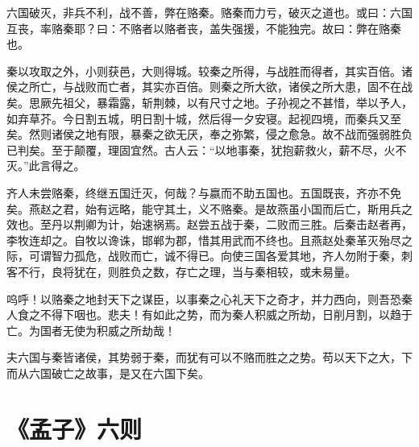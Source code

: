 \documentclass[12pt,UTF-8,openany]{ctexbook}
\begin{document}
\begin{normalsize}
    
    六国破灭，非兵不利，战不善，弊在赂秦。赂秦而力亏，破灭之道也。或曰：六国互丧，率赂秦耶？曰：不赂者以赂者丧，盖失强援，不能独完。故曰：弊在赂秦也。
    
    秦以攻取之外，小则获邑，大则得城。较秦之所得，与战胜而得者，其实百倍。诸侯之所亡，与战败而亡者，其实亦百倍。则秦之所大欲，诸侯之所大患，固不在战矣。思厥先祖父，暴霜露，斩荆棘，以有尺寸之地。子孙视之不甚惜，举以予人，如弃草芥。今日割五城，明日割十城，然后得一夕安寝。起视四境，而秦兵又至矣。然则诸侯之地有限，暴秦之欲无厌，奉之弥繁，侵之愈急。故不战而强弱胜负已判矣。至于颠覆，理固宜然。古人云：“以地事秦，犹抱薪救火，薪不尽，火不灭。”此言得之。
    
    齐人未尝赂秦，终继五国迁灭，何哉？与嬴而不助五国也。五国既丧，齐亦不免矣。燕赵之君，始有远略，能守其土，义不赂秦。是故燕虽小国而后亡，斯用兵之效也。至丹以荆卿为计，始速祸焉。赵尝五战于秦，二败而三胜。后秦击赵者再，李牧连却之。自牧以谗诛，邯郸为郡，惜其用武而不终也。且燕赵处秦革灭殆尽之际，可谓智力孤危，战败而亡，诚不得已。向使三国各爱其地，齐人勿附于秦，刺客不行，良将犹在，则胜负之数，存亡之理，当与秦相较，或未易量。
    
    呜呼！以赂秦之地封天下之谋臣，以事秦之心礼天下之奇才，并力西向，则吾恐秦人食之不得下咽也。悲夫！有如此之势，而为秦人积威之所劫，日削月割，以趋于亡。为国者无使为积威之所劫哉！
    
    夫六国与秦皆诸侯，其势弱于秦，而犹有可以不赂而胜之之势。苟以天下之大，下而从六国破亡之故事，是又在六国下矣。
\end{normalsize}



\chapter{《孟子》六则}
\end{document}
